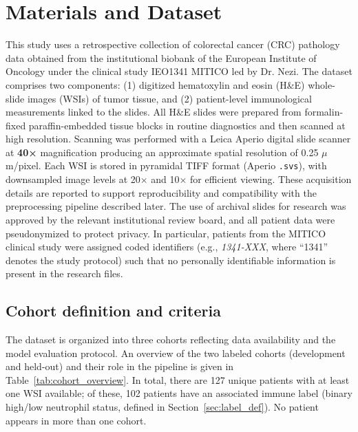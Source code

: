 \chapter{Materials and Dataset}
\label{ch:materials_dataset}

This study uses a retrospective collection of colorectal cancer (CRC) pathology data obtained from the institutional biobank of the European Institute of Oncology under the clinical study IEO1341 MITICO led by Dr. Nezi. The dataset comprises two components: (1) digitized hematoxylin and eosin (H\&E) whole-slide images (WSIs) of tumor tissue, and (2) patient-level immunological measurements linked to the slides. All H\&E slides were prepared from formalin-fixed paraffin-embedded tissue blocks in routine diagnostics and then scanned at high resolution. Scanning was performed with a Leica Aperio digital slide scanner at \textbf{40×} magnification producing an approximate spatial resolution of 0.25 $\mu$m/pixel. Each WSI is stored in pyramidal TIFF format (Aperio \texttt{.svs}), with downsampled image levels at 20× and 10× for efficient viewing. These acquisition details are reported to support reproducibility and compatibility with the preprocessing pipeline described later. The use of archival slides for research was approved by the relevant institutional review board, and all patient data were pseudonymized to protect privacy. In particular, patients from the MITICO clinical study were assigned coded identifiers (e.g., \emph{1341-XXX}, where “1341” denotes the study protocol) such that no personally identifiable information is present in the research files.

\section{Cohort definition and criteria}
\label{sec:cohorts}
The dataset is organized into three cohorts reflecting data availability and the model evaluation protocol. An overview of the two labeled cohorts (development and held-out) and their role in the pipeline is given in Table~\ref{tab:cohort_overview}. In total, there are 127 unique patients with at least one WSI available; of these, 102 patients have an associated immune label (binary high/low neutrophil status, defined in Section~\ref{sec:label_def}). No patient appears in more than one cohort.

